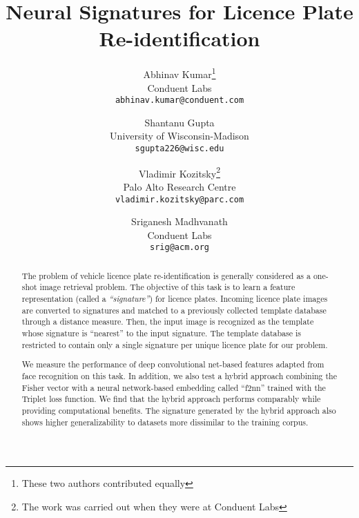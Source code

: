 \documentclass[10pt,twocolumn,letterpaper]{article}
\begin{document}
\title{Neural Signatures for Licence Plate Re-identification}

\author{Abhinav Kumar\thanks{These two authors contributed equally}\\
Conduent Labs\\
{\tt\small abhinav.kumar@conduent.com}
\and
Shantanu Gupta\footnotemark[1] \footnotemark[2]\\
University of Wisconsin-Madison\\
{\tt\small sgupta226@wisc.edu}
\and
Vladimir Kozitsky\thanks{The work was carried out when they were at Conduent Labs}\\
Palo Alto Research Centre \\
{\tt\small vladimir.kozitsky@parc.com}
\and
Sriganesh Madhvanath \\
Conduent Labs\\
{\tt\small srig@acm.org}
}
\maketitle

\ifwacvfinal\thispagestyle{empty}\fi

\begin{abstract}
    The problem of vehicle licence plate re-identification is generally considered as a one-shot image retrieval problem. The objective of this task is to learn a feature representation (called a \emph{``signature''}) for licence plates. Incoming licence plate images are converted to signatures and matched to a previously collected template database through a distance measure. Then, the input image is recognized as the template whose signature is ``nearest'' to the input signature. The template database is restricted to contain only a single signature per unique licence plate for our problem.

    We measure the performance of deep convolutional net-based features adapted from face recognition on this task. In addition, we also test a hybrid approach combining the Fisher vector with a neural network-based embedding called ``f2nn'' trained with the Triplet loss function. We find that the hybrid approach performs comparably while providing computational benefits. The signature generated by the hybrid approach also shows higher generalizability to datasets more dissimilar to the training corpus.\\

\end{abstract}
\end{document}
